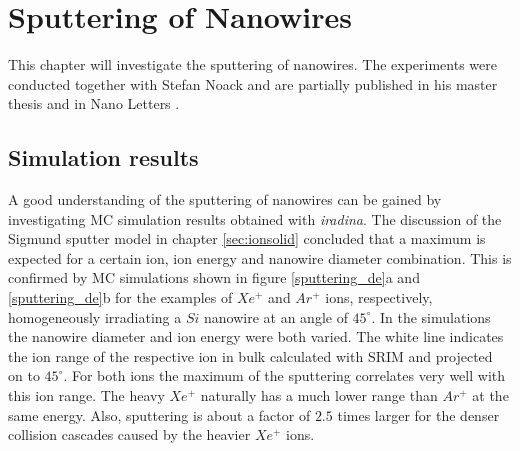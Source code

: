 \chapter{Sputtering of Nanowires}

This chapter will investigate the sputtering of nanowires. The experiments were conducted together with Stefan Noack and are partially published in his master thesis \cite{noack_sputter_2014} and in Nano Letters \cite{johannes_anomalous_2015}.




\section{Simulation results}
\label{sec:simsputering}

A good understanding of the sputtering of nanowires can be gained by investigating MC simulation results obtained with \emph{iradina}. The discussion of the Sigmund sputter model in chapter \ref{sec:ionsolid} concluded that a maximum is expected for a certain ion, ion energy and nanowire diameter combination. This is confirmed by MC simulations shown in figure \ref{sputtering_de}a and \ref{sputtering_de}b for the examples of $Xe^+$ and $Ar^+$ ions, respectively, homogeneously irradiating a $Si$ nanowire at an angle of $45^\circ$. In the simulations the nanowire diameter and ion energy were both varied. The white line indicates the ion range of the respective ion in bulk calculated with SRIM and projected on to $45^\circ$. For both ions the maximum of the sputtering correlates very well with this ion range. The heavy $Xe^+$ naturally has a much lower range than $Ar^+$ at the same energy. Also, sputtering is about a factor of $2.5$ times larger for the denser collision cascades caused by the heavier $Xe^+$ ions.

